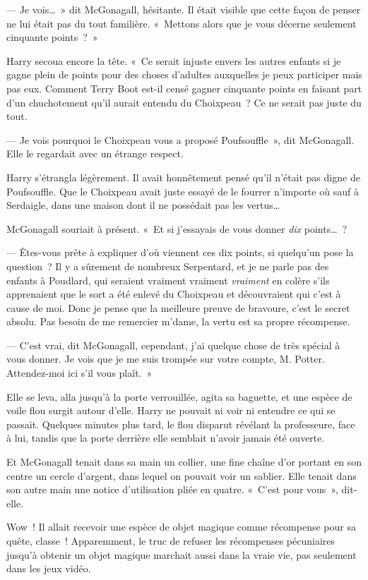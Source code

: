 --- Je vois…~» dit McGonagall, hésitante.
Il était visible que cette façon de penser ne lui était pas du tout familière.
«~Mettons alors que je vous décerne seulement cinquante points~?~»

Harry secoua encore la tête.
«~Ce serait injuste envers les autres enfants si je gagne plein de points pour des choses d'adultes auxquelles je peux participer mais pas eux.
Comment Terry Boot est-il censé gagner cinquante points en faisant part d'un chuchotement qu'il aurait entendu du Choixpeau~?
Ce ne serait pas juste du tout.

--- Je vois pourquoi le Choixpeau vous a proposé Poufsouffle~», dit McGonagall.
Elle le regardait avec un étrange respect.

Harry s'étrangla légèrement.
Il avait honnêtement pensé qu'il n'était pas digne de Poufsouffle.
Que le Choixpeau avait juste essayé de le fourrer n'importe où sauf à Serdaigle, dans une maison dont il ne possédait pas les vertus…

McGonagall souriait à présent.
«~Et si j'essayais de vous donner \emph{dix} points…~?

--- Êtes-vous prête à expliquer d'où viennent ces dix points, si quelqu'un pose la question~?
Il y a sûrement de nombreux Serpentard, et je ne parle pas des enfants à Poudlard, qui seraient vraiment vraiment \emph{vraiment} en colère s'ils apprenaient que le sort a été enlevé du Choixpeau et découvraient qui c'est à cause de moi.
Donc je pense que la meilleure preuve de bravoure, c'est le secret absolu.
Pas besoin de me remercier m'dame, la vertu est sa propre récompense.

--- C'est vrai, dit McGonagall, cependant, j'ai quelque chose de très spécial à vous donner.
Je vois que je me suis trompée sur votre compte, M. Potter.
Attendez-moi ici s'il vous plaît.~»

Elle se leva, alla jusqu'à la porte verrouillée, agita sa baguette, et une espèce de voile flou surgit autour d'elle.
Harry ne pouvait ni voir ni entendre ce qui se passait.
Quelques minutes plus tard, le flou disparut révélant la professeure, face à lui, tandis que la porte derrière elle semblait n'avoir jamais été ouverte.

Et McGonagall tenait dans sa main un collier, une fine chaîne d'or portant en son centre un cercle d'argent, dans lequel on pouvait voir un sablier.
Elle tenait dans son autre main une notice d'utilisation pliée en quatre.
«~C'est pour vous~», dit-elle.

Wow~! Il allait recevoir une espèce de objet magique comme récompense pour sa quête, classe~!
Apparemment, le truc de refuser les récompenses pécuniaires jusqu'à obtenir un objet magique marchait aussi dans la vraie vie, pas seulement dans les jeux vidéo.

